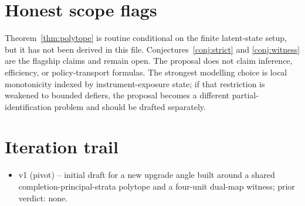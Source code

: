 \documentclass[11pt]{article}
\theoremstyle{definition}
\theoremstyle{plain}
\theoremstyle{remark}
\begin{document}
\section{Honest scope flags}
Theorem~\ref{thm:polytope} is routine conditional on the finite latent-state setup, but it has not been derived in this file. Conjectures~\ref{conj:strict} and \ref{conj:witness} are the flagship claims and remain open. The proposal does not claim inference, efficiency, or policy-transport formulas. The strongest modelling choice is local monotonicity indexed by instrument-exposure state; if that restriction is weakened to bounded defiers, the proposal becomes a different partial-identification problem and should be drafted separately.

\section{Iteration trail}
\begin{itemize}[leftmargin=*]
\item v1 (pivot) -- initial draft for a new upgrade angle built around a shared completion-principal-strata polytope and a four-unit dual-map witness; prior verdict: none.
\end{itemize}
\end{document}
